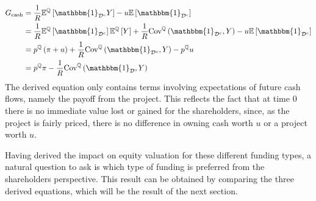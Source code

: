 \documentclass[main.tex]{subfiles}
\begin{document}
            \begin{align}
                G_{\text{cash}} &=
                    \discountfactor
                    \mathbb{E}^{\mathbb{Q}}\left[
                        \mathbbm{1}_{\mathcal{D}^{c}} Y
                    \right]
                    -
                    u
                    \mathbb{E}\left[\mathbbm{1}_{\mathcal{D}^{c}} \right]
                    \nonumber \\
                &=
                    \discountfactor
                    \mathbb{E}^{\mathbb{Q}}\left[\mathbbm{1}_{\mathcal{D}^{c}}\right] 
                    \mathbb{E}^{\mathbb{Q}}\left[Y\right] 
                    + 
                    \discountfactor
                    \text{Cov}^{\mathbb{Q}}\left(\mathbbm{1}_{\mathcal{D}^{c}}, Y\right) 
                    -
                    u
                    \mathbb{E}\left[\mathbbm{1}_{\mathcal{D}^{c}} \right]
                    \nonumber \\
                &= 
                    p^{\mathbb{Q}}
                    \left(
                        \pi + u
                    \right)
                    +
                    \discountfactor
                    \text{Cov}^{\mathbb{Q}}\left(\mathbbm{1}_{\mathcal{D}^{c}}, Y\right) 
                    -
                    p^{\mathbb{Q}}
                    u
                    \nonumber \\
                &=
                    p^{\mathbb{Q}}
                    \pi
                    -
                    \discountfactor
                    \text{Cov}^{\mathbb{Q}}\left(\mathbbm{1}_{\mathcal{D}}, Y\right) 
                \label{eqn:marginal-shareholder-value-cash-financing}
            \end{align}
        The derived equation only contains terms involving expectations of future cash flows,
        namely the payoff from the project.
        This reflects the fact that at time 0 there is no immediate value lost or gained
        for the shareholders, since, as the project is fairly priced, there is no difference
        in owning cash worth $u$ or a project worth $u$.

        Having derived the impact on equity valuation for these different funding types,
        a natural question to ask is which type of funding is preferred 
        from the shareholders perspective.
        This result can be obtained by comparing the three derived equations,
        which will be the result of the next section.
\end{document}
